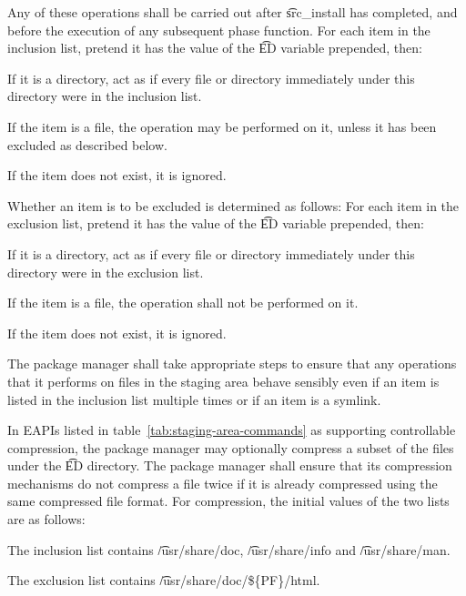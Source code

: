 Any of these operations shall be carried out after \t{src_install} has completed, and before the
execution of any subsequent phase function. For each item in the inclusion list, pretend it has
the value of the \t{ED} variable prepended, then:

\begin{compactitem}
\item If it is a directory, act as if every file or directory immediately under this directory
    were in the inclusion list.
\item If the item is a file, the operation may be performed on it, unless it has been excluded as
    described below.
\item If the item does not exist, it is ignored.
\end{compactitem}

Whether an item is to be excluded is determined as follows: For each item in the exclusion list,
pretend it has the value of the \t{ED} variable prepended, then:

\begin{compactitem}
\item If it is a directory, act as if every file or directory immediately under this directory
    were in the exclusion list.
\item If the item is a file, the operation shall not be performed on it.
\item If the item does not exist, it is ignored.
\end{compactitem}

The package manager shall take appropriate steps to ensure that any operations that it performs on
files in the staging area behave sensibly even if an item is listed in the inclusion list multiple
times or if an item is a symlink.

 In EAPIs listed in table~\ref{tab:staging-area-commands} as supporting
controllable compression, the package manager may optionally compress a subset of the files under
the \t{ED} directory. The package manager shall ensure that its compression mechanisms do not
compress a file twice if it is already compressed using the same compressed file format.
For compression, the initial values of the two lists are as follows:

\begin{compactitem}
\item The inclusion list contains \t{/usr/share/doc}, \t{/usr/share/info} and \t{/usr/share/man}.
\item The exclusion list contains \t{/usr/share/doc/\$\{PF\}/html}.
\end{compactitem}

